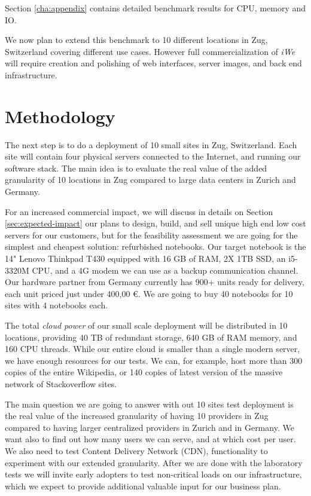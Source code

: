 Section \ref{cha:appendix} contains detailed benchmark results for CPU, memory
and IO.

We now plan to extend this benchmark to 10 different locations in Zug,
Switzerland covering different use cases. However full commercialization of
\textit{iWe} will require creation and polishing of web interfaces, server
images, and back end infrastructure.

\section{Methodology}
\label{sec:methodology}


The next step is to do a deployment of 10 small sites in Zug, Switzerland. Each
site will contain four physical servers connected to the Internet, and running
our software stack. The main idea is to evaluate the real value of the added
granularity of 10 locations in Zug compared to large data centers in Zurich and
Germany.

For an increased commercial impact, we will discuss in details on Section
\ref{sec:expected-impact} our plans to design, build, and sell unique high end
low cost servers for our customers, but for the feasibility assessment we are
going for the simplest and cheapest solution: refurbished notebooks. Our target
notebook is the 14" Lenovo Thinkpad T430 equipped with 16 GB of RAM, 2X 1TB SSD,
an i5-3320M CPU, and a 4G modem we can use as a backup communication channel.
Our hardware partner from Germany currently has 900+ units ready for delivery,
each unit priced just under 400,00 €. We are going to buy 40 notebooks for 10
sites with 4 notebooks each.

The total \textit{cloud power} of our small scale deployment will be distributed
in 10 locations, providing 40 TB of redundant storage, 640 GB of RAM memory, and
160 CPU threads. While our entire cloud is smaller than a single modern server,
we have enough resources for our tests. We can, for example, host more than 300
copies of the entire Wikipedia, or 140 copies of latest version of the massive
network of Stackoverflow sites.

The main question we are going to answer with out 10 sites test deployment is
the real value of the increased granularity of having 10 providers in Zug
compared to having larger centralized providers in Zurich and in Germany. We
want also to find out how many users we can serve, and at which cost per user.
We also need to test Content Delivery Network (CDN), functionality to experiment
with our extended granularity. After we are done with the laboratory tests we
will invite early adopters to test non-critical loads on our infrastructure,
which we expect to provide additional valuable input for our business plan.

